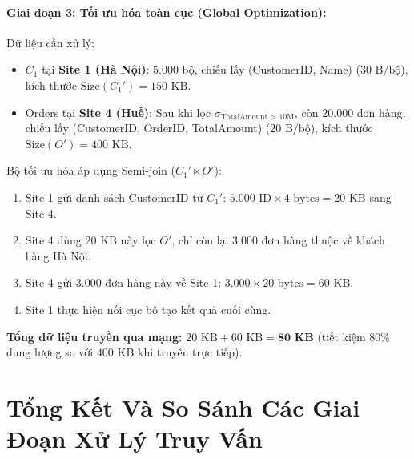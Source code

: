 \documentclass[12pt,a4paper]{report}
\begin{document}
\paragraph{Giai đoạn 3: Tối ưu hóa toàn cục (Global Optimization):}
Dữ liệu cần xử lý:
\begin{itemize}[leftmargin=0.8cm, topsep=1pt, itemsep=1pt]
    \item $C_1$ tại \textbf{Site 1 (Hà Nội)}: $5.000$ bộ, chiếu lấy (CustomerID, Name) ($30\text{ B/bộ}$), kích thước $\text{Size}(C_1') = 150\text{ KB}$.
    \item Orders tại \textbf{Site 4 (Huế)}: Sau khi lọc $\sigma_{\text{TotalAmount > 10M}}$, còn $20.000$ đơn hàng, chiếu lấy (CustomerID, OrderID, TotalAmount) ($20\text{ B/bộ}$), kích thước $\text{Size}(O') = 400\text{ KB}$.
\end{itemize}
Bộ tối ưu hóa áp dụng Semi-join ($C_1' \ltimes O'$):
\begin{enumerate}[leftmargin=0.8cm, topsep=1pt, itemsep=1pt]
    \item Site 1 gửi danh sách CustomerID từ $C_1'$: $5.000 \text{ ID} \times 4\text{ bytes} = 20\text{ KB}$ sang Site 4.
    \item Site 4 dùng $20\text{ KB}$ này lọc $O'$, chỉ còn lại $3.000$ đơn hàng thuộc về khách hàng Hà Nội.
    \item Site 4 gửi $3.000$ đơn hàng này về Site 1: $3.000 \times 20\text{ bytes} = 60\text{ KB}$.
    \item Site 1 thực hiện nối cục bộ tạo kết quả cuối cùng.
\end{enumerate}
\textbf{Tổng dữ liệu truyền qua mạng:} $20\text{ KB} + 60\text{ KB} = \mathbf{80\text{ KB}}$ (tiết kiệm $80\%$ dung lượng so với $400\text{ KB}$ khi truyền trực tiếp).

\section{Tổng Kết Và So Sánh Các Giai Đoạn Xử Lý Truy Vấn}
\end{document}
